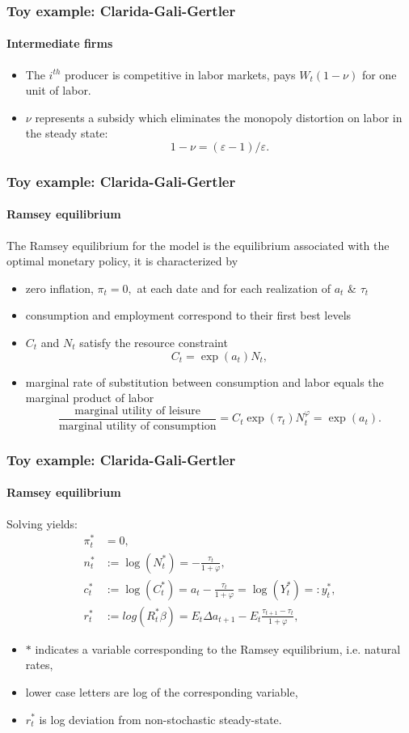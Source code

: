 \documentclass[handout]{beamer}  %
\begin{document}
\begin{frame}
\frametitle{Toy example: Clarida-Gali-Gertler}\framesubtitle{Intermediate firms}
\begin{itemize}
  \item The $i^{th}$ producer is competitive in labor markets, pays $W_{t}\left( 1-\nu \right)$ for one unit of labor.
  \item $\nu $ represents a subsidy which eliminates the monopoly distortion on labor in the steady state:
  $$1-\nu=\left( \varepsilon -1\right) /\varepsilon .$$
\end{itemize}
\end{frame}

\begin{frame}\frametitle{Toy example: Clarida-Gali-Gertler}\framesubtitle{Ramsey equilibrium}
The Ramsey equilibrium for the model is the equilibrium associated with the
optimal monetary policy, it is characterized by
\begin{itemize}
  \item zero inflation, $\pi _{t}=0,$ at each date and for each realization of $a_{t}$ \& $\tau _{t}$
  \item consumption and employment correspond to their first best levels
  \item $C_{t}$ and $N_{t}$ satisfy the resource constraint
\[
C_{t}=\exp \left( a_{t}\right) N_{t},
\]
\item marginal rate of substitution between consumption
and labor equals the marginal product of labor%
\[
\frac{\text{marginal utility of leisure}}{\text{marginal utility of
consumption}}=C_{t}\exp \left( \tau _{t}\right) N_{t}^{\varphi }=\exp \left(
a_{t}\right) .
\]%
\end{itemize}
\end{frame}

\begin{frame}\frametitle{Toy example: Clarida-Gali-Gertler}\framesubtitle{Ramsey equilibrium}
Solving yields:
\begin{align*}
\pi_t^* &= 0,\\
n^*_t &:= \log \left( N_{t}^{\ast }\right) =-\frac{\tau _{t}}{1+\varphi },\\
c^*_t &:= \log \left( C_{t}^{\ast }\right) =a_{t}-\frac{\tau _{t}}{1+\varphi } = \log\left( Y_{t}^{\ast }\right) =: y^*_t,\\
r_t^* &:= log(R_t^* \beta) =E_{t}\Delta a_{t+1}-E_{t}\frac{\tau _{t+1}-\tau _{t}}{1+\varphi },
\end{align*}
\begin{itemize}
  \item $\ast $ indicates a variable corresponding to the Ramsey equilibrium, i.e. natural rates,
  \item lower case letters are log of the corresponding variable,
  \item $r_t^*$ is log deviation from non-stochastic steady-state.
\end{itemize}
\end{frame}
\end{document}
